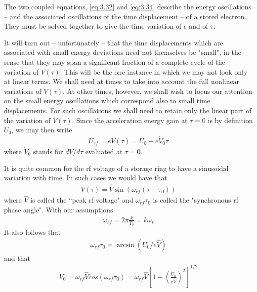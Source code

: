 The two coupled equations, \eqref{eq:3.32} and \eqref{eq:3.34} describe the energy oscillations -- and the associated oscillations of the time displacement -- of a stored electron. They must be solved together to give the time variation of $\epsilon$ and of $\tau$.

It will turn out -- unfortunately -- that the time displacements which are associated with small energy deviations need not themselves be "small", in the sense that they may span a significant fraction of a complete cycle of the variation of $V(\tau)$. This will be the one instance in which we may not look only at linear terms. We shall need at times to take into account the full nonlinear variations of $V(\tau)$. At other times, however, we shall wish to focus our attention on the small energy oscillations which correspond also to small time displacements. For such oscillations we shall need to retain only the linear part of the variation of $V(\tau)$. Since the acceleration energy gain at $\tau = 0$ is by definition $U_0$, we may then write
\begin{align}
	U_{rf} = eV(\tau) = U_0 + e\dot{V}_0\tau\label{eq:3.35}
\end{align}
where $\dot{V}_0$ stands for $dV/d\tau$ evaluated at $\tau=0$.

It is quite common for the rf voltage of a storage ring to have a sinusoidal variation with time. In such cases we would have that
\begin{align}\label{eq:3.36}
	V(\tau) = \widehat{V} \sin(\omega_{rf}(\tau+\tau_0))
\end{align}
where $\widehat{V}$ is called the “peak rf voltage" and $\omega_{rf}\tau_0$  is called the "synchronous rf phase angle". With our assumptions
\begin{align}
	\omega_{rf} = 2\pi \frac{k}{T_0} = k\omega_r
\end{align}
It also follows that
\begin{align}
	\omega_{rf}\tau_0 = \arcsin(U_0/e\widehat{V})
\end{align}
and that
\begin{align}
	\dot{V}_0 = \omega_{rf}\widehat{V}cos(\omega_{rf}\tau_0) = \omega_{rf}\widehat{V}\left[1-\left(\frac{U_0}{e\widehat{V}}\right)^2\right]^{1/2}
\end{align}
